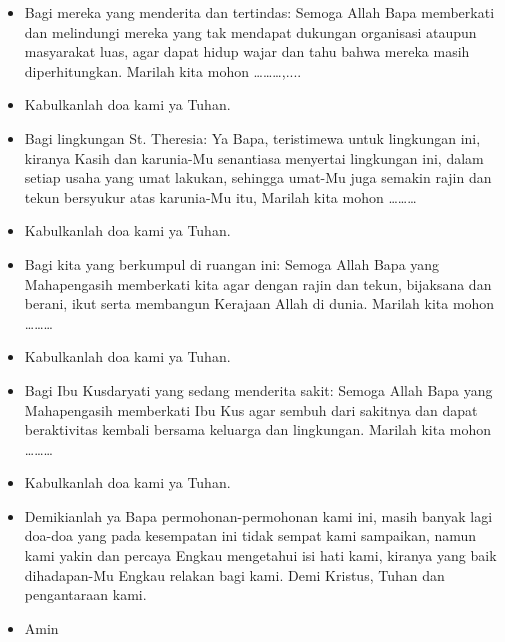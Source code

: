 \documentclass[12pt]{scrartcl}
\newcommand{\BU}[1]{\begin{itemize} \item[U:] #1 \end{itemize}}
\newcommand{\BI}[1]{\begin{itemize} \item[I:] #1 \end{itemize}}
\newcommand{\BP}[1]{\begin{itemize} \item[P:] #1 \end{itemize}}
\begin{document}
\BP{Bagi mereka yang menderita dan tertindas: Semoga Allah Bapa memberkati dan melindungi mereka yang tak mendapat dukungan organisasi ataupun masyarakat luas, agar dapat hidup wajar dan tahu bahwa mereka masih diperhitungkan. Marilah kita mohon \dots\dots\dots,....}

\BU{Kabulkanlah doa kami ya Tuhan.}

\BP{Bagi lingkungan St. Theresia: Ya Bapa, teristimewa untuk lingkungan ini, kiranya Kasih dan karunia-Mu senantiasa menyertai lingkungan ini, dalam setiap usaha yang umat lakukan, sehingga umat-Mu juga semakin rajin dan tekun bersyukur atas karunia-Mu itu, Marilah kita mohon \dots\dots\dots}

\BU{Kabulkanlah doa kami ya Tuhan.}

\BP{Bagi kita yang berkumpul di ruangan ini: Semoga Allah Bapa yang Mahapengasih memberkati kita agar dengan rajin dan tekun, bijaksana dan berani, ikut serta membangun Kerajaan Allah di dunia. Marilah kita mohon \dots\dots\dots}

\BU{Kabulkanlah doa kami ya Tuhan.}

\BP{Bagi Ibu Kusdaryati yang sedang menderita sakit: Semoga Allah Bapa yang Mahapengasih memberkati Ibu Kus agar sembuh dari sakitnya dan dapat beraktivitas kembali bersama keluarga dan lingkungan. Marilah kita mohon \dots\dots\dots}

\BU{Kabulkanlah doa kami ya Tuhan.}

\BI{Demikianlah ya Bapa permohonan-permohonan kami ini, masih banyak lagi doa-doa yang pada kesempatan ini tidak sempat kami sampaikan, namun kami yakin dan percaya Engkau mengetahui isi hati kami, kiranya yang baik dihadapan-Mu Engkau relakan bagi kami. Demi Kristus, Tuhan dan  pengantaraan kami.}

\BU{Amin}
\end{document}
